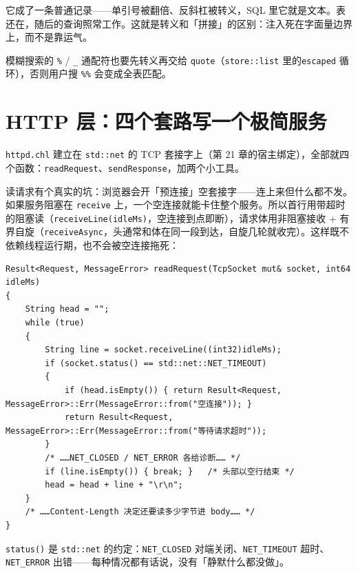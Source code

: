 它成了一条普通记录——单引号被翻倍、反斜杠被转义，SQL 里它就是文本。表还在，随后的查询照常工作。这就是转义和「拼接」的区别：注入死在字面量边界上，而不是靠运气。

模糊搜索的 \texttt{\%} / \texttt{\_} 通配符也要先转义再交给 \texttt{quote}（\texttt{store:\allowbreak{}:\allowbreak{}list} 里的\texttt{escaped} 循环），否则用户搜 \texttt{\%\%} 会变成全表匹配。

\section{HTTP 层：四个套路写一个极简服务}

\texttt{httpd.\allowbreak{}chl} 建立在 \texttt{std:\allowbreak{}:\allowbreak{}net} 的 TCP 套接字上（第 21 章的宿主绑定），全部就四个函数：\texttt{read\allowbreak{}Request}、\texttt{send\allowbreak{}Response}，加两个小工具。

读请求有个真实的坑：浏览器会开「预连接」空套接字——连上来但什么都不发。如果服务阻塞在 \texttt{receive} 上，一个空连接就能卡住整个服务。所以首行用带超时的阻塞读（\texttt{receive\allowbreak{}Line(\allowbreak{}idle\allowbreak{}Ms)\allowbreak{}}，空连接到点即断），请求体用非阻塞接收 + 有界自旋（\texttt{receive\allowbreak{}Async}，头通常和体在同一段到达，自旋几轮就收完）。这样既不依赖线程运行期，也不会被空连接拖死：

\par
\medskip
\begin{lstlisting}[style=chali]
Result<Request, MessageError> readRequest(TcpSocket mut& socket, int64 idleMs)
{
    String head = "";
    while (true)
    {
        String line = socket.receiveLine((int32)idleMs);
        if (socket.status() == std::net::NET_TIMEOUT)
        {
            if (head.isEmpty()) { return Result<Request, MessageError>::Err(MessageError::from("空连接")); }
            return Result<Request, MessageError>::Err(MessageError::from("等待请求超时"));
        }
        /* ……NET_CLOSED / NET_ERROR 各给诊断…… */
        if (line.isEmpty()) { break; }   /* 头部以空行结束 */
        head = head + line + "\r\n";
    }
    /* ……Content-Length 决定还要读多少字节进 body…… */
}
\end{lstlisting}
\par
\medskip

\texttt{status(\allowbreak{})\allowbreak{}} 是 \texttt{std:\allowbreak{}:\allowbreak{}net} 的约定：\texttt{NET\_CLOSED} 对端关闭、\texttt{NET\_TIMEOUT} 超时、\texttt{NET\_ERROR} 出错——每种情况都有话说，没有「静默什么都没做」。

